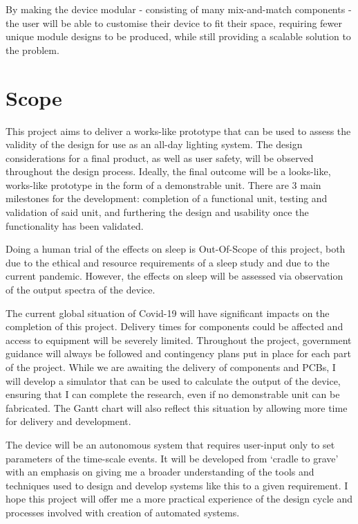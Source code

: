 \documentclass[twoside,twocolumn]{article}
\begin{document}
By making the device modular - consisting of many mix-and-match components - the user will be able to customise their device to fit their space, requiring fewer unique module designs to be produced, while still providing a scalable solution to the problem.



\section{Scope}
\label{sec:scope}

This project aims to deliver a works-like prototype that can be used to assess the validity of the design for use as an all-day lighting system. 
The design considerations for a final product, as well as user safety, will be observed throughout the design process.
Ideally, the final outcome will be a looks-like, works-like prototype in the form of a demonstrable unit. There are 3 main milestones for the development: completion of a functional unit, testing and validation of said unit, and furthering the design and usability once the functionality has been validated.

Doing a human trial of the effects on sleep is Out-Of-Scope of this project, both due to the ethical and resource requirements of a sleep study and due to the current pandemic. However, the effects on sleep will be assessed via	 observation of the output spectra of the device.

The current global situation of Covid-19 will have significant impacts on the completion of this project. Delivery times for components could be affected and access to equipment will be severely limited. Throughout the project, government guidance will always be followed and contingency plans put in place for each part of the project. While we are awaiting the delivery of components and PCBs, I will develop a simulator that can be used to calculate the output of the device, ensuring that I can complete the research, even if no demonstrable unit can be fabricated. The Gantt chart will also reflect this situation by allowing more time for delivery and development.

The device will be an autonomous system that requires user-input only to set parameters of the time-scale events.	It will be developed from `cradle to grave' with an emphasis on giving me a broader understanding of the tools and techniques used to design and develop systems like this to a given requirement. I hope this project will offer me a more practical experience of the design cycle and processes involved with creation of automated systems.
\end{document}
